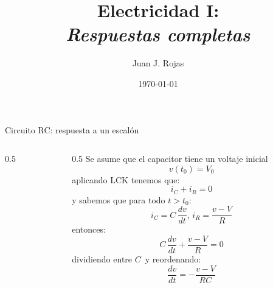\documentclass[aspectratio=169]{beamer}
\title{Electricidad I: \\ \emph{Respuestas completas}}
\author{
    Juan J. Rojas
}
\institute{Instituto Tecnológico de Costa Rica}
\date{\today}
\begin{document}

\maketitle

\begin{frame}{Circuito RC: respuesta a un escalón}
    \begin{columns}[onlytextwidth]
    \begin{column}{0.5\textwidth}
        \centering
    \end{column}
    \begin{column}{0.5\textwidth}
        {Se asume que el capacitor tiene un voltaje inicial
        \begin{equation*}
            v(t_0) = V_0
        \end{equation*}
        }
            {
            {aplicando LCK tenemos que:
            \begin{equation*}
                i_C + i_R = 0
            \end{equation*}
            }
            {y sabemos que para todo $t>t_0$: 
            \begin{equation*}
                i_C = C\,\dfrac{dv}{dt},\, i_R=\dfrac{v-V}{R}
            \end{equation*}
            }
            {entonces:
            \begin{equation*}
                C\,\dfrac{dv}{dt} + \dfrac{v-V}{R} = 0
            \end{equation*}
            }
        }
            {
            {dividiendo entre $C\,$ y reordenando:
            \begin{equation*}
                \dfrac{dv}{dt} = -\dfrac{v-V}{RC}
            \end{equation*}
            }}
\end{column}
\end{columns}
\end{frame}
\end{document}
